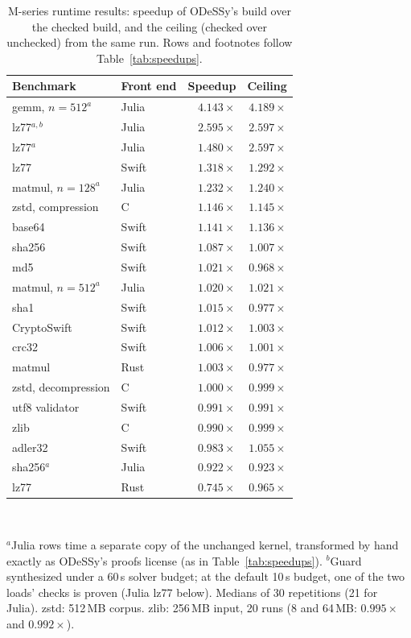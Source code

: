 \documentclass[acmsmall,screen,nonacm]{acmart}
\newcommand{\odessy}{ODeSSy}
\newcommand{\tool}{\odessy}
\begin{document}
\begin{table}[h]
\caption{M-series runtime results: speedup of \tool{}'s build over the
checked build, and the ceiling (checked over unchecked) from the same
run. Rows and footnotes follow Table~\ref{tab:speedups}.}
\label{tab:app-runtime}
\small
\begin{tabular}{llrr}
\toprule
Benchmark & Front end & Speedup & Ceiling\\
\midrule
gemm, $n{=}512^{a}$ & Julia & $4.143\times$ & $4.189\times$\\
lz77$^{a,b}$ & Julia & $2.595\times$ & $2.597\times$\\
lz77$^{a}$ & Julia & $1.480\times$ & $2.597\times$\\
lz77 & Swift & $1.318\times$ & $1.292\times$\\
matmul, $n{=}128^{a}$ & Julia & $1.232\times$ & $1.240\times$\\
zstd, compression & C & $1.146\times$ & $1.145\times$\\
base64 & Swift & $1.141\times$ & $1.136\times$\\
sha256 & Swift & $1.087\times$ & $1.007\times$\\
md5 & Swift & $1.021\times$ & $0.968\times$\\
matmul, $n{=}512^{a}$ & Julia & $1.020\times$ & $1.021\times$\\
sha1 & Swift & $1.015\times$ & $0.977\times$\\
CryptoSwift & Swift & $1.012\times$ & $1.003\times$\\
crc32 & Swift & $1.006\times$ & $1.001\times$\\
matmul & Rust & $1.003\times$ & $0.977\times$\\
zstd, decompression & C & $1.000\times$ & $0.999\times$\\
utf8 validator & Swift & $0.991\times$ & $0.991\times$\\
zlib & C & $0.990\times$ & $0.999\times$\\
adler32 & Swift & $0.983\times$ & $1.055\times$\\
sha256$^{a}$ & Julia & $0.922\times$ & $0.923\times$\\
lz77 & Rust & $0.745\times$ & $0.965\times$\\
\bottomrule
\end{tabular}\\
\raggedright\footnotesize
$^{a}$Julia rows time a separate copy of the unchanged kernel, transformed
by hand exactly as \tool{}'s proofs license (as in
Table~\ref{tab:speedups}).
$^{b}$Guard synthesized under a 60\,s solver budget; at the default
10\,s budget, one of the two loads' checks is proven (Julia lz77 below).
Medians of 30 repetitions (21 for Julia).
zstd: 512\,MB corpus. zlib: 256\,MB input, 20 runs (8 and 64\,MB:
$0.995\times$ and $0.992\times$).\par
\end{table}
\end{document}
